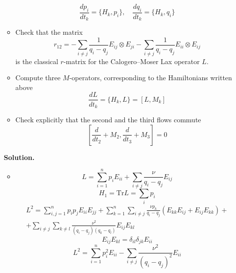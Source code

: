 \documentclass[12pt]{article}
\theoremstyle{definition}
\begin{document}
\begin{enumerate}
\begin{itemize}
        \begin{equation}
            \frac{dp_i}{dt_k}=\{H_k, p_i\},\quad \frac{dq_i}{dt_k}=\{H_k,q_i\}
        \end{equation}
        \item Check that the matrix
        \begin{equation}
            r_{12} = -\sum_{i\neq j}\frac{1}{q_i-q_j}E_{ij}\otimes E_{ji}-\sum_{i\neq j}\frac{1}{q_i-q_j}E_{ii}\otimes E_{ij}
        \end{equation}
        is the classical $r$-matrix for the Calogero–Moser Lax operator $L$.
        \item Compute three $M$-operators, corresponding to the Hamiltonians written above
        \begin{equation}
            \frac{dL}{dt_k}=\{H_k, L\}=[L, M_k]
        \end{equation}
        \item Check explicitly that the second and the third flows commute
        \begin{equation}
            \left[\frac{d}{dt_2}+M_2,\frac{d}{dt_3}+M_3\right]=0
        \end{equation}
    \end{itemize}
    \textbf{Solution.}
    \begin{itemize}
        \item 
        \begin{equation}
            L=\sum_{i=1}^n p_iE_{ii}+\sum_{i\neq j}\frac{\nu}{q_i-q_j}E_{ij}
        \end{equation}
        \begin{equation}
            \boxed{H_1=\text{Tr}L=\sum\limits_ip_i}
        \end{equation}
        \begin{multline}
            L^2=\sum_{i,j=1}^np_ip_jE_{ii}E_{jj}+\sum\limits_{k=1}^n\sum\limits_{i\neq j}\frac{\nu p_k}{q_i-q_j}(E_{kk}E_{ij}+E_{ij}E_{kk})+\\+\sum\limits_{i\neq j}\sum\limits_{k\neq l}\frac{\nu^2}{(q_i-q_j)(q_k-q_l)}E_{ij}E_{kl}
        \end{multline}
        \begin{equation}
            E_{ij}E_{kl}=\delta_{il}\delta_{jk}E_{ii}
        \end{equation}
        \begin{equation}
            L^2=\sum\limits_{i=1}^np_i^2E_{ii}-\sum\limits_{i\neq j}\frac{\nu^2}{(q_i-q_j)^2}E_{ii}
        \end{equation}

\end{itemize}
\end{enumerate}
\end{document}
